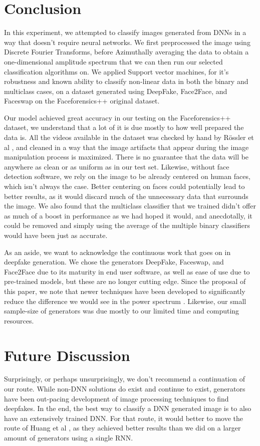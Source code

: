 \documentclass[11pt,twocolumn,letterpaper]{article}
\begin{document}
\section{Conclusion}
In this experiment, we attempted to classify images generated from DNNs in a way that doesn't require neural networks. We first preprocessed the image using Discrete Fourier Transforms, before Azimuthally averaging the data to obtain a one-dimensional amplitude spectrum that we can then run our selected classification algorithms on. We applied Support vector machines, for it's robustness and known ability to classify non-linear data in both the binary and multiclass cases, on a dataset generated using DeepFake, Face2Face, and Faceswap on the Faceforensics++ original dataset.\par
Our model achieved great accuracy in our testing on the Faceforensics++ dataset, we understand that a lot of it is due mostly to how well prepared the data is. All the videos available in the dataset was checked by hand by Rössler et al \cite{rssler2019faceforensics}, and cleaned in a way that the image artifacts that appear during the image manipulation process is maximized. There is no guarantee that the data will be anywhere as clean or as uniform as in our test set. Likewise, without face detection software, we rely on the image to be already centered on human faces, which isn't always the case. Better centering on faces could potentially lead to better results, as it would discard much of the unnecessary data that surrounds the image. We also found that the multiclass classifier that we trained didn't offer as much of a boost in performance as we had hoped it would, and anecdotally, it could be removed and simply using the average of the multiple binary classifiers would have been just as accurate.\par
As an aside, we want to acknowledge the continuous work that goes on in deepfake generation. We chose the generators DeepFake, Faceswap, and Face2Face due to its maturity in end user software, as well as ease of use due to pre-trained models, but these are no longer cutting edge. Since the proposal of this paper, we note that newer techniques have been developed to significantly reduce the difference we would see in the power spectrum \cite{dang2019detection} \cite{tolosana2020deepfakes}. Likewise, our small sample-size of generators was due mostly to our limited time and computing resources.

\section{Future Discussion}
Surprisingly, or perhaps unsurprisingly, we don't recommend a continuation of our route. While non-DNN solutions do exist and continue to exist, generators have been out-pacing development of image processing techniques to find deepfakes. In the end, the best way to classify a DNN generated image is to also have an extensively trained DNN. For that route, it would better to move the route of Huang et al \cite{Huang2020FakeLocatorRL}, as they achieved better results than we did on a larger amount of generators using a single RNN.
\end{document}
